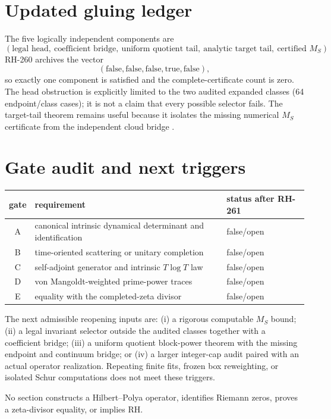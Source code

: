 \documentclass[11pt]{article}
\begin{document}
\section{Updated gluing ledger}

The five logically independent components are
\[
 (\text{legal head},\ \text{coefficient bridge},\ \text{uniform quotient
 tail},\ \text{analytic target tail},\ \text{certified }M_S).
\]
RH-260 archives the vector
\[
 (\mathrm{false},\mathrm{false},\mathrm{false},\mathrm{true},\mathrm{false}),
\]
so exactly one component is satisfied and the complete-certificate count is
zero.  The head obstruction is explicitly limited to the two audited
expanded classes (64 endpoint/class cases); it is not a claim that every
possible selector fails.  The target-tail theorem remains useful because it
isolates the missing numerical $M_S$ certificate from the independent cloud
bridge \citep{WangRH260}.

\section{Gate audit and next triggers}

\begin{center}
\begin{tabular}{cll}
\toprule
gate & requirement & status after RH-261\\
\midrule
A & canonical intrinsic dynamical determinant and identification & false/open\\
B & time-oriented scattering or unitary completion & false/open\\
C & self-adjoint generator and intrinsic $T\log T$ law & false/open\\
D & von Mangoldt-weighted prime-power traces & false/open\\
E & equality with the completed-zeta divisor & false/open\\
\bottomrule
\end{tabular}
\end{center}

The next admissible reopening inputs are: (i) a rigorous computable $M_S$
bound; (ii) a legal invariant selector outside the audited classes together
with a coefficient bridge; (iii) a uniform quotient block-power theorem with
the missing endpoint and continuum bridge; or (iv) a larger integer-cap audit
paired with an actual operator realization.  Repeating finite fits, frozen
box reweighting, or isolated Schur computations does not meet these triggers.

No section constructs a Hilbert--Polya operator, identifies Riemann zeros,
proves a zeta-divisor equality, or implies RH.



\end{document}
